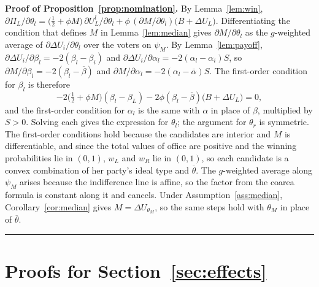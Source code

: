\documentclass[12pt,letterpaper]{article}
\newenvironment{proof}[1][Proof]{\noindent\textbf{#1.} }{\ \rule{0.5em}{0.5em}}
\begin{document}
\begin{proof}[Proof of Proposition~\ref{prop:nomination}]
By Lemma~\ref{lem:win}, $\partial \Pi_L/\partial\theta_l=\big(\tfrac12+\phi M\big)\,\partial U_L^l/\partial\theta_l+\phi\,(\partial M/\partial\theta_l)\big(B+\Delta U_L\big)$. Differentiating the condition that defines $M$ in Lemma~\ref{lem:median} gives $\partial M/\partial\theta_l$ as the $g$-weighted average of $\partial\Delta U_i/\partial\theta_l$ over the voters on $\psi_M$. By Lemma~\ref{lem:payoff}, $\partial\Delta U_i/\partial\beta_l=-2(\beta_l-\beta_i)$ and $\partial\Delta U_i/\partial\alpha_l=-2(\alpha_l-\alpha_i)S$, so $\partial M/\partial\beta_l=-2(\beta_l-\overline{\beta})$ and $\partial M/\partial\alpha_l=-2(\alpha_l-\overline{\alpha})S$. The first-order condition for $\beta_l$ is therefore
\[
-2\Big(\tfrac12+\phi M\Big)(\beta_l-\beta_L)-2\phi(\beta_l-\overline{\beta})\big(B+\Delta U_L\big)=0,
\]
and the first-order condition for $\alpha_l$ is the same with $\alpha$ in place of $\beta$, multiplied by $S>0$. Solving each gives the expression for $\theta_l$; the argument for $\theta_r$ is symmetric. The first-order conditions hold because the candidates are interior and $M$ is differentiable, and since the total values of office are positive and the winning probabilities lie in $(0,1)$, $w_L$ and $w_R$ lie in $(0,1)$, so each candidate is a convex combination of her party's ideal type and $\overline{\theta}$. The $g$-weighted average along $\psi_M$ arises because the indifference line is affine, so the factor from the coarea formula \citep{EvansGariepy2015} is constant along it and cancels. Under Assumption~\ref{ass:median}, Corollary~\ref{cor:median} gives $M=\Delta U_{\theta_M}$, so the same steps hold with $\theta_M$ in place of $\overline{\theta}$.
\end{proof}

\section{Proofs for Section~\ref{sec:effects}}
\end{document}
